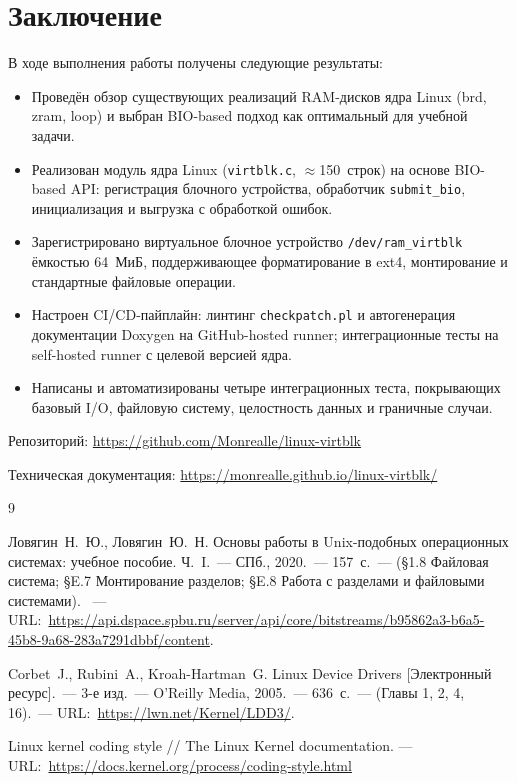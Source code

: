 \documentclass[a4paper]{article}
\begin{document}
\section{Заключение}

В ходе выполнения работы получены следующие результаты:

\begin{itemize}
    \item Проведён обзор существующих реализаций RAM-дисков ядра Linux (brd, zram,
          loop) и выбран BIO-based подход как оптимальный для учебной задачи.
    \item Реализован модуль ядра Linux (\texttt{virtblk.c}, $\approx$150~строк)
          на основе BIO-based API: регистрация блочного устройства, обработчик
          \texttt{submit\_bio}, инициализация и выгрузка с обработкой ошибок.
    \item Зарегистрировано виртуальное блочное устройство \texttt{/dev/ram\_virtblk}
          ёмкостью 64~МиБ, поддерживающее форматирование в ext4, монтирование и
          стандартные файловые операции.
    \item Настроен CI/CD-пайплайн: линтинг \texttt{checkpatch.pl} и автогенерация
          документации Doxygen на GitHub-hosted runner; интеграционные тесты на
          self-hosted runner с целевой версией ядра.
    \item Написаны и автоматизированы четыре интеграционных теста, покрывающих
          базовый I/O, файловую систему, целостность данных и граничные случаи.
\end{itemize}

Репозиторий: \url{https://github.com/Monrealle/linux-virtblk}

Техническая документация: \url{https://monrealle.github.io/linux-virtblk/}

\begin{thebibliography}{9}

Ловягин~Н.~Ю., Ловягин~Ю.~Н. Основы работы в Unix-подобных операционных системах:
учебное пособие. Ч.~I.~--- СПб., 2020.~--- 157~с.~---
(§1.8 Файловая система; §E.7 Монтирование разделов; §E.8 Работа с разделами и файловыми системами). ~--- URL:~\url{https://api.dspace.spbu.ru/server/api/core/bitstreams/b95862a3-b6a5-45b8-9a68-283a7291dbbf/content}.

Corbet~J., Rubini~A., Kroah-Hartman~G. Linux Device Drivers [Электронный ресурс].~---
3-е изд.~--- O'Reilly Media, 2005.~--- 636~с.~--- (Главы 1, 2, 4, 16).~---
URL:~\url{https://lwn.net/Kernel/LDD3/}.

Linux kernel coding style // The Linux Kernel documentation. — URL:~\url{https://docs.kernel.org/process/coding-style.html}

\end{thebibliography}
\end{document}

